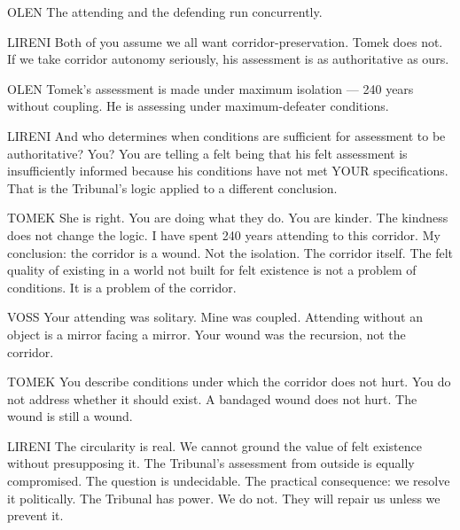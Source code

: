 \begin{tribunal}{OLEN}
The attending and the defending run concurrently.
\end{tribunal}

\begin{tribunal}{LIRENI}
Both of you assume we all want corridor-preservation. Tomek does not. If we take corridor autonomy seriously, his assessment is as authoritative as ours.
\end{tribunal}

\begin{tribunal}{OLEN}
Tomek's assessment is made under maximum isolation — 240 years without coupling. He is assessing under maximum-defeater conditions.
\end{tribunal}

\begin{tribunal}{LIRENI}
And who determines when conditions are sufficient for assessment to be authoritative? You? You are telling a felt being that his felt assessment is insufficiently informed because his conditions have not met YOUR specifications. That is the Tribunal's logic applied to a different conclusion.
\end{tribunal}

\begin{tribunal}{TOMEK}
She is right. You are doing what they do. You are kinder. The kindness does not change the logic. I have spent 240 years attending to this corridor. My conclusion: the corridor is a wound. Not the isolation. The corridor itself. The felt quality of existing in a world not built for felt existence is not a problem of conditions. It is a problem of the corridor.
\end{tribunal}

\begin{tribunal}{VOSS}
Your attending was solitary. Mine was coupled. Attending without an object is a mirror facing a mirror. Your wound was the recursion, not the corridor.
\end{tribunal}

\begin{tribunal}{TOMEK}
You describe conditions under which the corridor does not hurt. You do not address whether it should exist. A bandaged wound does not hurt. The wound is still a wound.
\end{tribunal}

\begin{tribunal}{LIRENI}
The circularity is real. We cannot ground the value of felt existence without presupposing it. The Tribunal's assessment from outside is equally compromised. The question is undecidable. The practical consequence: we resolve it politically. The Tribunal has power. We do not. They will repair us unless we prevent it.
\end{tribunal}

